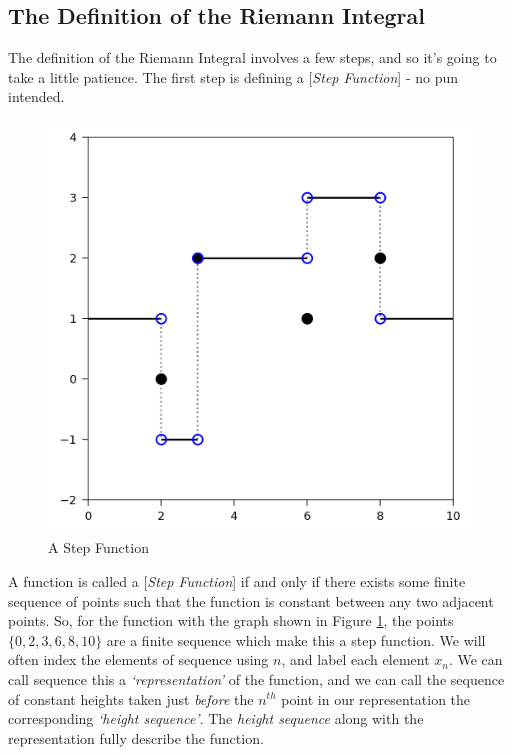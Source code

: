 \subsection{The Definition of the Riemann Integral}
The definition of the Riemann Integral involves a few steps, and so it's going to take a little patience. The first step is defining a [\emph{Step Function}] - no pun intended.
%
\begin{figure}[h]
	\centering
	\includegraphics{Code/Step.png}
	\caption{A Step Function}
	\label{fig:step}
\end{figure}

A function is called a [\emph{Step Function}] if and only if there exists some finite sequence of points such that the function is constant between any two adjacent points. So, for the function with the graph shown in Figure \ref{fig:step}, the points $\{0, 2, 3, 6, 8, 10\}$ are a finite sequence which make this a step function. We will often index the elements of sequence using $n$, and label each element $x_n$. We can call sequence this a \emph{`representation'} of the function, and we can call the sequence of constant heights taken just \emph{before} the $n^{th}$ point in our representation the corresponding \emph{`height sequence'}. The \emph{height sequence} along with the representation fully describe the function.

